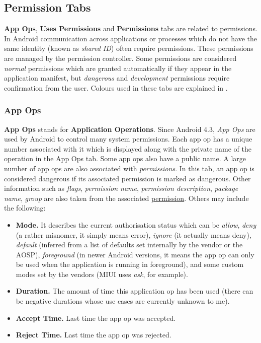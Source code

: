 \subsection{Permission Tabs}\label{subsec:permission-tabs} %
\textbf{App Ops}, \textbf{Uses Permissions} and \textbf{Permissions} tabs are related to permissions. In Android
communication across applications or processes which do not have the same identity (known as \textit{shared ID}) often
require permissions. These permissions are managed by the permission controller. Some permissions are considered
\textit{normal} permissions which are granted automatically if they appear in the application manifest, but
\textit{dangerous} and \textit{development} permissions require confirmation from the user. Colours used in these tabs
are explained in .

\subsubsection{App Ops}\label{subsubsec:app-ops} %
\textbf{App Ops} stands for \textbf{Application Operations}. Since Android 4.3, \textit{App Ops} are used by Android to
control many system permissions. Each app op has a unique number associated with it which is displayed along with the
private name of the operation in the App Ops tab. Some app ops also have a public name. A large number of app ops are
also associated with \textit{permissions}. In this tab, an app op is considered dangerous if its associated permission
is marked as dangerous. Other information such as \textit{flags}, \textit{permission name}, \textit{permission description},
\textit{package name}, \textit{group} are also taken from the associated \hyperref[subsubsec:permissions]{permission}.
Others may include the following:
\begin{itemize}
    \item \textbf{Mode.} It describes the current authorisation status which can be \textit{allow}, \textit{deny} (a
    rather misnomer, it simply means error), \textit{ignore} (it actually means deny), \textit{default} (inferred from
    a list of defaults set internally by the vendor or the AOSP), \textit{foreground} (in newer Android versions, it
    means the app op can only be used when the application is running in foreground), and some custom modes set by the
    vendors (MIUI uses \textit{ask}, for example).

    \item \textbf{Duration.} The amount of time this application op has been used (there can be negative durations whose
    use cases are currently unknown to me).

    \item \textbf{Accept Time.} Last time the app op was accepted.

    \item \textbf{Reject Time.} Last time the app op was rejected.
\end{itemize}


